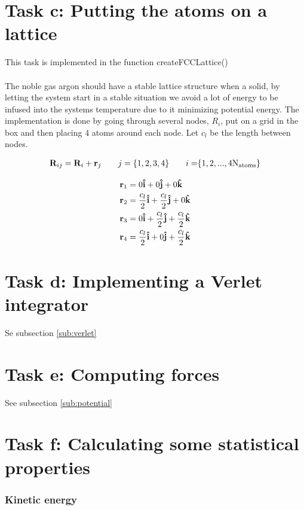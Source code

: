 \documentclass[11pt]{article}
\begin{document}
\section{Task c: Putting the atoms on a lattice}
	This task is implemented in the function createFCCLattice()
\\ \\
	\noindent The noble gas argon should have a stable lattice structure when a solid, by letting the system start in a stable situation we avoid a lot of energy to be infused into the systems temperature due to it minimizing potential energy. The implementation is done by going through several nodes, \(R_i\), put on a grid in the box and then placing 4 atoms around each node. Let \(c_l\) be the length between nodes.

	\begin{align*}
	\vb{R}_{ij} = \vb{R}_i + \vb{r}_j \qquad{j }= \{1,2,3,4\} \qquad{i = }\{1,2, ... , 4\text{N}_{\text{atoms}}\}
	\end{align*}

	\begin{align*}
		\vb{r}_1 &= 0 \vu{i} + 0 \vu{j} + 0 \vu{k}
		\\
		\vb{r}_2 &= \frac{c_l}{2} \vu{i} + \frac{c_l}{2} \vu{j} + 0 \vu{k}
		\\
		\vb{r}_3 &= 0 \vu{i} + \frac{c_l}{2} \vu{j} + \frac{c_l}{2} \vu{k}
		\\
		\vb{r}_4 &= \frac{c_l}{2} \vu{i} + 0 \vu{j} + \frac{c_l}{2} \vu{k}
	\end{align*}


\section{Task d: Implementing a Verlet integrator}
	Se subsection \ref{sub:verlet}

\section{Task e: Computing forces}
	See subsection \ref{sub:potential}

\section{Task f: Calculating some statistical properties}
	\subsubsection{Kinetic energy}
\end{document}
